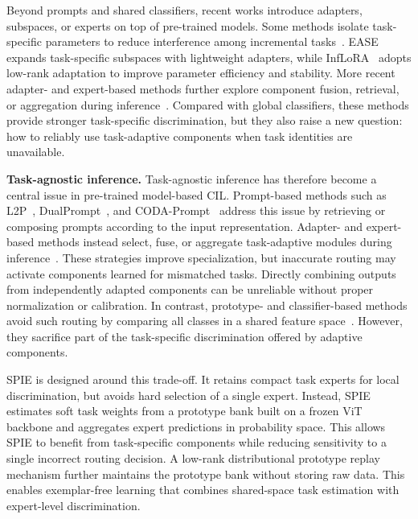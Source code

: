 Beyond prompts and shared classifiers, recent works introduce adapters, subspaces, or experts on top of pre-trained models.
Some methods isolate task-specific parameters to reduce interference among incremental tasks~\cite{gao2023unified,wang2023isolation}.
EASE~\cite{ease2024} expands task-specific subspaces with lightweight adapters, while InfLoRA~\cite{liang2024inflora} adopts low-rank adaptation to improve parameter efficiency and stability.
More recent adapter- and expert-based methods further explore component fusion, retrieval, or aggregation during inference~\cite{gao2024beyond,cofima2024,wang2025integrating,mos2025}.
Compared with global classifiers, these methods provide stronger task-specific discrimination, but they also raise a new question: how to reliably use task-adaptive components when task identities are unavailable.

\noindent\textbf{Task-agnostic inference.}
Task-agnostic inference has therefore become a central issue in pre-trained model-based CIL.
Prompt-based methods such as L2P~\cite{wang2022learning}, DualPrompt~\cite{wang2022dualprompt}, and CODA-Prompt~\cite{smith2023coda} address this issue by retrieving or composing prompts according to the input representation.
Adapter- and expert-based methods instead select, fuse, or aggregate task-adaptive modules during inference~\cite{ease2024,liang2024inflora,wang2025integrating,mos2025}.
These strategies improve specialization, but inaccurate routing may activate components learned for mismatched tasks. Directly combining outputs from independently adapted components can be unreliable without proper normalization or calibration.
In contrast, prototype- and classifier-based methods avoid such routing by comparing all classes in a shared feature space~\cite{fecam2023,ranpac2023,zhou2025revisiting}. However, they sacrifice part of the task-specific discrimination offered by adaptive components.

SPIE is designed around this trade-off.
It retains compact task experts for local discrimination, but avoids hard selection of a single expert.
Instead, SPIE estimates soft task weights from a prototype bank built on a frozen ViT backbone and aggregates expert predictions in probability space.
This allows SPIE to benefit from task-specific components while reducing sensitivity to a single incorrect routing decision.
A low-rank distributional prototype replay mechanism further maintains the prototype bank without storing raw data. This enables exemplar-free learning that combines shared-space task estimation with expert-level discrimination.

